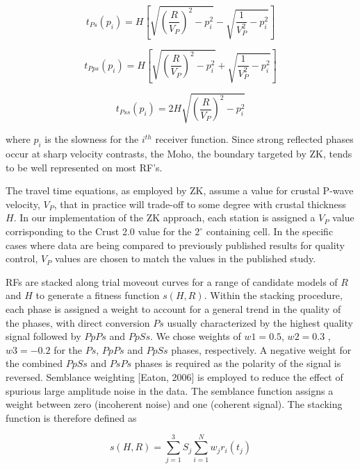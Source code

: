 \documentclass[draft, 12pt]{article}
\begin{document}
\begin{equation} \label{eq:tps}
t_{Ps}(p_i)=H \left[ \sqrt{ \left(\frac{R}{V_P}\right)^2 - p_i^2} - \sqrt{\frac{1}{V_P^2} - p_i^2} \right]
\end{equation}

\begin{equation}
t_{Pps}(p_i)=H \left[ \sqrt{ \left(\frac{R}{V_P}\right)^2 - p_i^2} + \sqrt{\frac{1}{V_P^2} - p_i^2} \right]
\end{equation}

\begin{equation}
t_{Pss}(p_i)= 2H  \sqrt{ \left(\frac{R}{V_P}\right)^2 - p_i^2}
\end{equation}

where $p_i$ is the slowness for the $i^{th}$ receiver function. Since strong reflected phases occur at sharp velocity contrasts, the Moho, the boundary targeted by ZK, tends to be well represented on most RF's.

The travel time equations, as employed by ZK, assume a value for crustal P-wave velocity, $V_P$, that in practice will trade-off to some degree with crustal thickness $H$. In our implementation of the ZK approach, each station is assigned a $V_P$ value corrisponding to the Crust 2.0 value for the $2^\circ$ containing cell. In the specific cases where data are being compared to previously published results for quality control, $V_P$  values are chosen to match the values in the published study.

RFs are stacked along trial moveout curves for a range of candidate models of $R$ and $H$ to generate a fitness function $s(H,R)$.  Within the stacking procedure, each phase is assigned a weight to account for a general trend in the quality of the phases, with direct conversion $Ps$ usually characterized by the highest quality signal followed by $PpPs$ and $PpSs$. We chose weights of $w1 = 0.5$, $w2 = 0.3$ , $w3 = -0.2$ for the $Ps$, $PpPs$ and $PpSs$ phases, respectively. A negative weight for the combined $PpSs$ and $PsPs$ phases is required as the polarity of the signal is reversed. Semblance weighting [Eaton, 2006] is employed to reduce the effect of spurious large amplitude noise in the data. The semblance function assigns a weight between zero (incoherent noise) and one (coherent signal). The stacking function is therefore defined as

\begin{equation}  \label{eq:stack}
s(H,R) = \sum_{j=1}^{3} S_j \sum_{i=1}^N w_jr_i(t_j)
\end{equation}
\end{document}
